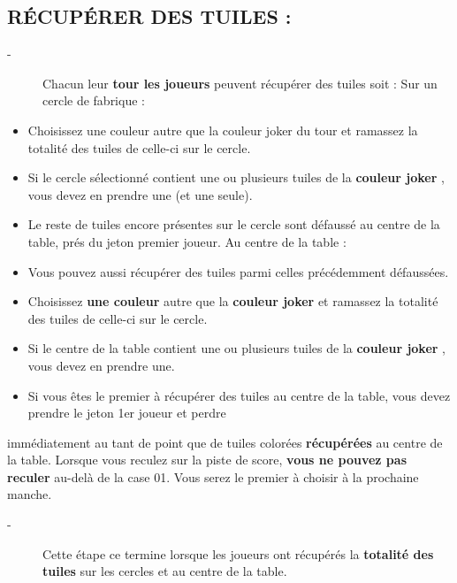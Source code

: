 \documentclass{scrartcl}%
\begin{document}
\subsection{ RÉCUPÉRER DES TUILES :
}%
\label{subsec:RCUPRERDESTUILES}%
\begin{description}%
\item[{-} ]%
%
 Chacun leur %
\textcolor{mygreen}{%
\textbf{tour les joueurs}%
}%
\textit{ }%
 peuvent récupérer des tuiles soit : Sur un cercle de fabrique :
%
\end{description}%
\begin{itemize}%
\item%
%
 Choisissez une couleur autre que la couleur joker du tour et ramassez la totalité des tuiles de celle{-}ci sur le cercle.
%
\item%
%
 Si le cercle sélectionné contient une ou plusieurs tuiles de la %
\textcolor{mygreen}{%
\textbf{couleur joker}%
}%
, vous devez en prendre une (et une seule).
%
\item%
%
 Le reste de tuiles encore présentes sur le cercle sont défaussé au centre de la table, prés du jeton premier joueur. Au centre de la table :
%
\item%
%
 Vous pouvez aussi récupérer des tuiles parmi celles précédemment défaussées.
%
\item%
%
 Choisissez %
\textcolor{mygreen}{%
\textbf{une couleur}%
}%
\textit{ }%
 autre que la %
\textcolor{mygreen}{%
\textbf{couleur joker}%
}%
\textit{ }%
 et ramassez la totalité des tuiles de celle{-}ci sur le cercle.
%
\item%
%
 Si le centre de la table contient une ou plusieurs tuiles de la %
\textcolor{mygreen}{%
\textbf{couleur joker}%
}%
, vous devez en prendre une.
%
\item%
%
 Si vous êtes le premier à récupérer des tuiles au centre de la table, vous devez prendre le jeton 1er joueur et perdre
%
\end{itemize}%
immédiatement au tant de point que de tuiles colorées %
\textcolor{mygreen}{%
\textbf{récupérées}%
}%
\textit{ }%
 au centre de la table. Lorsque vous reculez sur la piste de score, %
\textcolor{mygreen}{%
\textbf{vous ne pouvez pas reculer}%
}%
\textit{ }%
 au{-}delà de la case 01. Vous serez le premier à choisir à la prochaine manche.
%
\begin{description}%
\item[{-} ]%
%
 Cette étape ce termine lorsque les joueurs ont récupérés la %
\textcolor{mygreen}{%
\textbf{totalité des tuiles}%
}%
\textit{ }%
 sur les cercles et au centre de la table.
%
\end{description}
\end{document}
